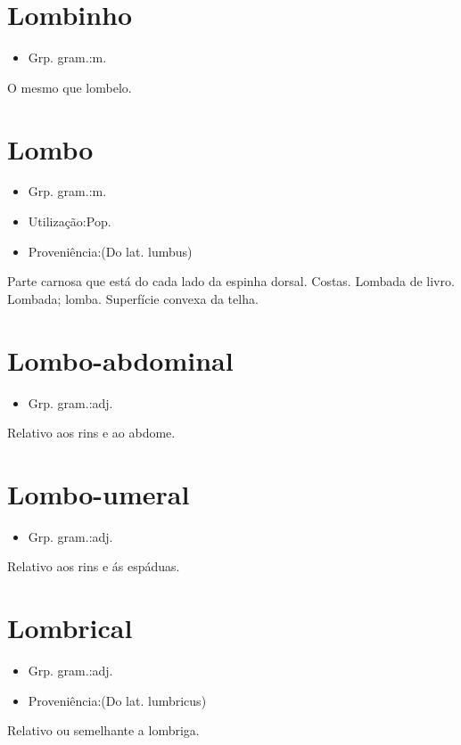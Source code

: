 \section{Lombinho}
\begin{itemize}
\item {Grp. gram.:m.}
\end{itemize}
O mesmo que \textunderscore lombelo\textunderscore .
\section{Lombo}
\begin{itemize}
\item {Grp. gram.:m.}
\end{itemize}
\begin{itemize}
\item {Utilização:Pop.}
\end{itemize}
\begin{itemize}
\item {Proveniência:(Do lat. \textunderscore lumbus\textunderscore )}
\end{itemize}
Parte carnosa que está do cada lado da espinha dorsal.
Costas.
Lombada de livro.
Lombada; lomba.
Superfície convexa da telha.
\section{Lombo-abdominal}
\begin{itemize}
\item {Grp. gram.:adj.}
\end{itemize}
Relativo aos rins e ao abdome.
\section{Lombo-umeral}
\begin{itemize}
\item {Grp. gram.:adj.}
\end{itemize}
Relativo aos rins e ás espáduas.
\section{Lombrical}
\begin{itemize}
\item {Grp. gram.:adj.}
\end{itemize}
\begin{itemize}
\item {Proveniência:(Do lat. \textunderscore lumbricus\textunderscore )}
\end{itemize}
Relativo ou semelhante a lombriga.
